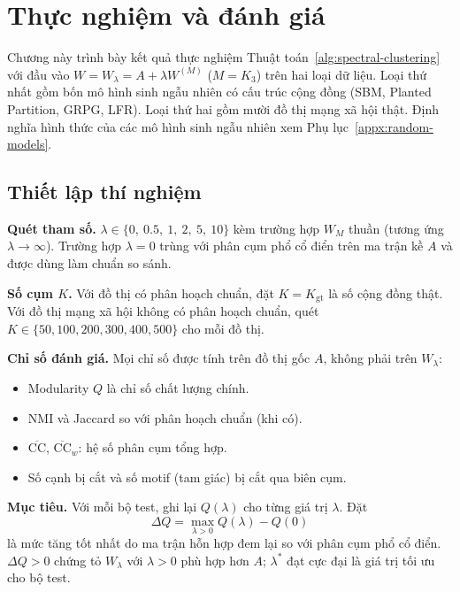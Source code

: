 
\chapter{Thực nghiệm và đánh giá}
\label{chap:thuc-nghiem}

Chương này trình bày kết quả thực nghiệm Thuật toán~\ref{alg:spectral-clustering} với đầu vào $W = W_\lambda = A + \lambda W^{(M)}$ ($M = K_3$) trên hai loại dữ liệu. Loại thứ nhất gồm bốn mô hình sinh ngẫu nhiên có cấu trúc cộng đồng (SBM, Planted Partition, GRPG, LFR). Loại thứ hai gồm mười đồ thị mạng xã hội thật. Định nghĩa hình thức của các mô hình sinh ngẫu nhiên xem Phụ lục~\ref{appx:random-models}.

\section{Thiết lập thí nghiệm}
\label{sec:setup}

\textbf{Quét tham số.} $\lambda \in \{0,\ 0.5,\ 1,\ 2,\ 5,\ 10\}$ kèm trường hợp $W_M$ thuần (tương ứng $\lambda \to \infty$). Trường hợp $\lambda = 0$ trùng với phân cụm phổ cổ điển trên ma trận kề $A$ và được dùng làm chuẩn so sánh.

\textbf{Số cụm $K$.} Với đồ thị có phân hoạch chuẩn, đặt $K = K_{\mathrm{gt}}$ là số cộng đồng thật. Với đồ thị mạng xã hội không có phân hoạch chuẩn, quét $K \in \{50, 100, 200, 300, 400, 500\}$ cho mỗi đồ thị.

\textbf{Chỉ số đánh giá.} Mọi chỉ số được tính trên đồ thị gốc $A$, không phải trên $W_\lambda$:
\begin{itemize}
    \item Modularity $Q$ là chỉ số chất lượng chính.
    \item NMI và Jaccard so với phân hoạch chuẩn (khi có).
    \item $\overline{\mathrm{CC}}$, $\overline{\mathrm{CC}}_w$: hệ số phân cụm tổng hợp.
    \item Số cạnh bị cắt và số motif (tam giác) bị cắt qua biên cụm.
\end{itemize}

\textbf{Mục tiêu.} Với mỗi bộ test, ghi lại $Q(\lambda)$ cho từng giá trị $\lambda$. Đặt
\[
    \Delta Q = \max_{\lambda > 0} Q(\lambda) - Q(0)
\]
là mức tăng tốt nhất do ma trận hỗn hợp đem lại so với phân cụm phổ cổ điển. $\Delta Q > 0$ chứng tỏ $W_\lambda$ với $\lambda > 0$ phù hợp hơn $A$; $\lambda^*$ đạt cực đại là giá trị tối ưu cho bộ test.

